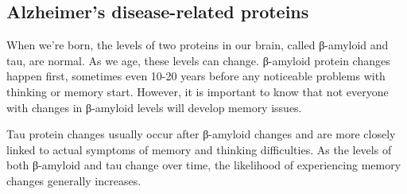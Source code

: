 \subsection{Alzheimer's disease-related proteins}

When we’re born, the levels of two proteins in our brain, called β-amyloid and tau, are normal. As we age, these levels can change. β-amyloid protein changes happen first, sometimes even 10-20 years before any noticeable problems with thinking or memory start. However, it is important to know that not everyone with changes in β-amyloid levels will develop memory issues.

Tau protein changes usually occur after β-amyloid changes and are more closely linked to actual symptoms of memory and thinking difficulties. As the levels of both β-amyloid and tau change over time, the likelihood of experiencing memory changes generally increases.